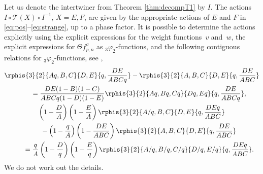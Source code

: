 Let us denote the intertwiner from Theorem \ref{thm:decompT1} by $I$. The actions $I\circ \mathcal T(X)\circ I^{-1}$, $X=E,F$, are given by the appropriate actions of $E$ and $F$ in \eqref{eq:pos}--\eqref{eq:strange}, up to a phase factor. It is possible to determine the actions explicitly using the explicit expressions for the weight functions~$v$ and~$w$, the explicit expressions for $\Theta f_{p,n}^\sigma$ as $_3\varphi_2$-functions, and the following contiguous relations for $_3\varphi_2$-functions, see \cite[(2.3), (2.4)]{GIM96},
\begin{gather*}
\rphis{3}{2}{Aq,B,C}{D,E}{q,\frac{DE}{ABCq}} - \rphis{3}{2}{A,B,C}{D,E}{q,\frac{DE}{ABC}}  \\
\qquad{}=\frac{DE(1-B)(1-C)}{ABCq(1-D)(1-E)} \rphis{3}{2}{Aq,Bq,Cq}{Dq,Eq}{q,\frac{DE}{ABCq}},
\\
\left(1-\frac{D}{A}\right)\left(1-\frac{E}{A}\right) \rphis{3}{2}{A/q,B,C}{D,E}{q,\frac{DEq}{ABC}} \\
\qquad{} -\left(1-\frac{q}{A}\right)\left(1-\frac{DE}{ABC}\right)\rphis{3}{2}{A,B,C}{D,E}{q,\frac{DE}{ABC}}
\\
\qquad{}=\frac{q}{A}\left(1-\frac{D}{q} \right) \left(1-\frac{E}{q} \right)\rphis{3}{2}{A/q,B/q,C/q}{D/q,E/q}{q,\frac{DEq}{ABC}}.
\end{gather*}
We do not work out the details.
